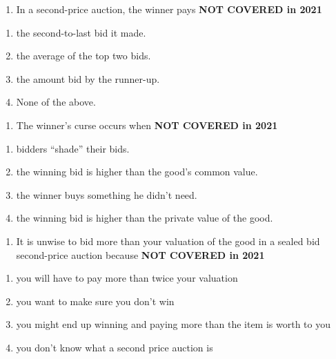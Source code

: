 \documentclass[11pt,]{article}
\providecommand{\tightlist}{%
  \setlength{\itemsep}{0pt}\setlength{\parskip}{0pt}}
\begin{document}
\begin{enumerate}
\def\labelenumi{\arabic{enumi})}
\setcounter{enumi}{20}
\tightlist
\item
  In a second-price auction, the winner pays \textbf{NOT COVERED in 2021}
\end{enumerate}

\begin{enumerate}
\def\labelenumi{\Alph{enumi})}
\tightlist
\item
  the second-to-last bid it made.
\item
  the average of the top two bids.
\item
  the amount bid by the runner-up.
\item
  None of the above.
\end{enumerate}

\begin{enumerate}
\def\labelenumi{\arabic{enumi})}
\setcounter{enumi}{21}
\tightlist
\item
  The winner's curse occurs when \textbf{NOT COVERED in 2021}
\end{enumerate}

\begin{enumerate}
\def\labelenumi{\Alph{enumi})}
\tightlist
\item
  bidders ``shade'' their bids.
\item
  the winning bid is higher than the good's common value.
\item
  the winner buys something he didn't need.
\item
  the winning bid is higher than the private value of the good.
\end{enumerate}

\begin{enumerate}
\def\labelenumi{\arabic{enumi})}
\setcounter{enumi}{22}
\tightlist
\item
  It is unwise to bid more than your valuation of the good in a sealed
  bid second-price auction because \textbf{NOT COVERED in 2021}
\end{enumerate}

\begin{enumerate}
\def\labelenumi{\Alph{enumi})}
\tightlist
\item
  you will have to pay more than twice your valuation
\item
  you want to make sure you don't win
\item
  you might end up winning and paying more than the item is worth to you
\item
  you don't know what a second price auction is
\end{enumerate}
\end{document}
